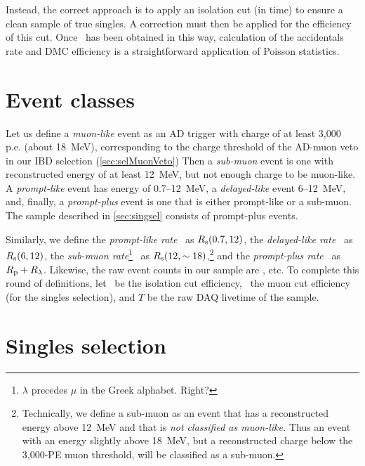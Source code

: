 \documentclass[../thesis.tex]{subfiles}
\begin{document}
Instead, the correct approach is to apply an isolation cut (in time) to ensure a clean sample of true singles. A correction must then be applied for the efficiency of this cut. Once \Rs\ has been obtained in this way, calculation of the accidentals rate and DMC efficiency is a straightforward application of Poisson statistics.

\section{Event classes}
\label{sec:accdmcevtcls}

Let us define a \emph{muon-like} event as an AD trigger with charge of at least 3,000 p.e. (about 18~MeV), corresponding to the charge threshold of the AD-muon veto in our IBD selection (\autoref{sec:selMuonVeto})
Then a \emph{sub-muon} event is one with reconstructed energy of at least 12~MeV, but not enough charge to be muon-like. A \emph{prompt-like} event has energy of 0.7--12~MeV, a \emph{delayed-like} event 6--12~MeV, and, finally, a \emph{prompt-plus} event is one that is either prompt-like or a sub-muon. The sample described in \autoref{sec:singsel} consists of prompt-plus events.

Similarly, we define the \emph{prompt-like rate} \Rpro\ as $R_\mathrm{s}(0.7, 12)$, the \emph{delayed-like rate} \Rdel\ as $R_\mathrm{s}(6, 12)$, the \emph{sub-muon
  rate}\footnote{$\lambda$ precedes $\mu$ in the Greek alphabet. Right?}
\Rsub\ as $R_\mathrm{s}(12, \sim18)$,\footnote{Technically, we define a sub-muon as an event that has a reconstructed energy above 12~MeV and that is \emph{not classified as muon-like.} Thus an event with an energy slightly above 18~MeV, but a reconstructed charge below the 3,000-PE muon threshold, will be classified as a sub-muon.} and the \emph{prompt-plus rate} \Rplu\ as $R_\mathrm{p} + R_\mathrm{\lambda}$. Likewise, the raw event counts in our sample are \Npro, etc. To complete this round of definitions, let \eisol\ be the isolation cut efficiency, \emu\ the muon cut efficiency (for the singles selection), and $T$ be the raw DAQ livetime of the sample.

\section{Singles selection}
\label{sec:singsel}
\end{document}
